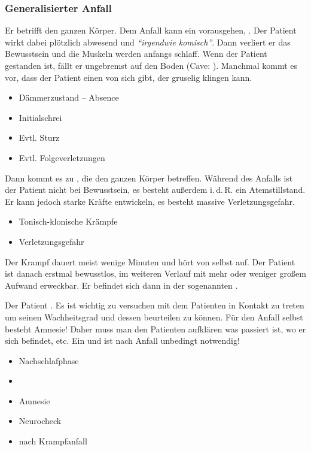 \subsubsection{Generalisierter Anfall}
\label{topic:krampfanfall-generalisierter}

{%
Er betrifft den ganzen Körper. Dem Anfall kann ein
vorausgehen, . Der Patient wirkt
dabei plötzlich abwesend und \emph{\enquote{irgendwie komisch}}.
Dann verliert er das Bewusstsein und die Muskeln werden
anfangs schlaff. Wenn der Patient gestanden ist, fällt er
ungebremst auf den Boden (Cave: ).
Manchmal kommt es vor, dass der Patient einen
 von sich gibt, der
gruselig klingen kann. 
}{
\begin{itemize}
  \item Dämmerzustand -- Absence
  \item Initialschrei
  \item Evtl. Sturz
  \item Evtl. Folgeverletzungen
\end{itemize}

}{}{}{}

{%
Dann kommt es zu
,
die den ganzen Körper betreffen. Während des Anfalls ist der
Patient nicht bei Bewusstsein, es besteht außerdem i.\,d.\,R.
ein Atemstillstand. Er kann jedoch starke Kräfte entwickeln, es
besteht massive
Verletzungsgefahr.
}{
\begin{itemize}
  \item Tonisch-klonische Krämpfe
  \item Verletzungsgefahr
\end{itemize}
}{}{}{}


{%
Der Krampf dauert meist wenige Minuten und hört von selbst
auf. Der Patient ist danach erstmal bewusstlos, im weiteren
Verlauf mit mehr oder weniger großem Aufwand erweckbar. Er
befindet sich dann in der sogenannten
.

Der Patient . Es ist
wichtig zu versuchen mit dem Patienten in Kontakt zu treten
um seinen Wachheitsgrad und dessen
 beurteilen zu können. Für den Anfall selbst besteht
Amnesie! Daher muss man den Patienten aufklären was passiert
ist, wo er sich befindet, etc. Ein  und
 ist nach \underline{} Anfall
unbedingt notwendig! 
}{
\begin{itemize}
  \item Nachschlafphase
  \item {}
  \item Amnesie
  \item Neurocheck
  \item {} nach \underline{} Krampfanfall
\end{itemize}
}{}{}{}


